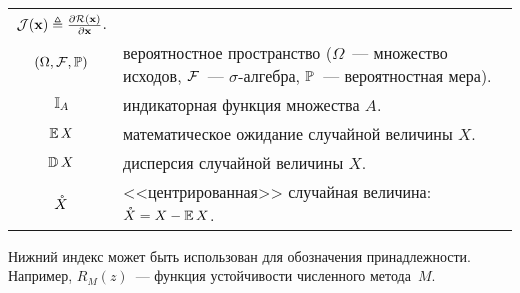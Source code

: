 \begin{center}
\begin{tabularx}{\textwidth}{cl}
                                           $ \mathcal{J}(\mathbf{x}) \triangleq \frac{\partial \mathcal{R}(\mathbf{x})}{\partial \mathbf{x}} $. \\
        \rule{0pt}{16pt}%
        $ (\Omega, \mathcal{F}, \mathbb{P}) $ & \makecell[l]{вероятностное пространство ($ \Omega $~--- множество исходов, \\
                                                        $ \mathcal{F} $~--- $ \sigma $-алгебра, $ \mathbb{P} $~--- вероятностная мера).} \\
        $ \mathbb{I}_A $                 & индикаторная функция множества $ A $. \\
        $ \operatorname{\mathbb{E}} X $                    & математическое ожидание случайной величины $ X $. \\
        $ \operatorname{\mathbb{D}} X $                & дисперсия случайной величины $ X $. \\
        $ \mathring{X} $                  & <<центрированная>> случайная величина: $ \mathring{X} = X - \operatorname{\mathbb{E}} X $. \\
    \end{tabularx}
\end{center}

Нижний индекс может быть использован для обозначения принадлежности.
Например, $ R_M(z) $~--- функция устойчивости численного метода~$ M $.
